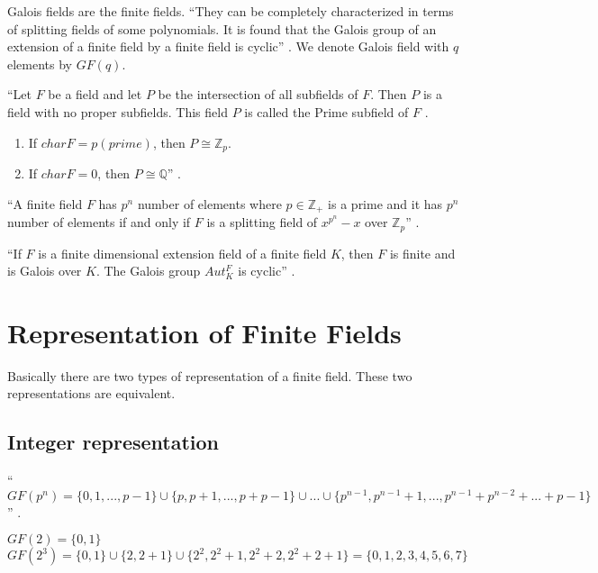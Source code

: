 Galois fields are the finite fields. ``They can be completely characterized in terms of splitting fields of some polynomials. It is found that the Galois group of an extension of a finite field by a finite field is cyclic'' \cite{hunger}. We denote Galois field with \(q\) elements by \(GF(q)\).

\begin{definition}
``Let \(F\) be a field and let \(P\) be the intersection of all subfields of \(F\). Then \(P\) is a field with no proper subfields. This field \(P\) is called the Prime subfield of \(F\) \cite{hunger}.
\end{definition}

\begin{enumerate}
\item If \(charF=p(prime)\), then \(P\cong {\mathbb{Z}}_p\).
\item If \(charF=0\), then \(P\cong \mathbb{Q}\)'' \cite{hunger}.
\end{enumerate}

\begin{theorem}
``A  finite field \(F\) has \(p^n\) number of elements where \(p \in \mathbb{Z}_+\) is a prime and it has \(p^n\) number of elements if and only if \(F\) is a splitting field of \(x^{p^n} - x\) over \(\mathbb{Z}_p\)'' \cite{hunger}.
\end{theorem}
\vspace{4mm}

\begin{theorem}
  ``If \(F\) is a finite dimensional extension field of a finite field \(K\), then \(F\) is finite and is Galois over \(K\). The Galois group \(Aut_K^F\) is cyclic'' \cite{hunger}.
\end{theorem}

\section{Representation of Finite Fields}
Basically there are two types of representation of a finite field. These two representations are equivalent.
\subsection{Integer representation}

``\(GF(p^n)=\{0,1,...,p-1\} \cup \{p,p+1,...,p+p-1\} \cup ... \cup \{p^{n-1},p^{n-1}+1,...,p^{n-1}+p^{n-2}+...+p-1\}\)'' \cite{galois}.

\begin{example}
    \(GF(2)=\{0,1\}\)\\
    \(GF(2^3)=\{0,1\} \cup \{2,2+1\} \cup \{2^2,2^2+1,2^2+2,2^2+2+1\}=\{0,1,2,3,4,5,6,7\}\)
\end{example}

